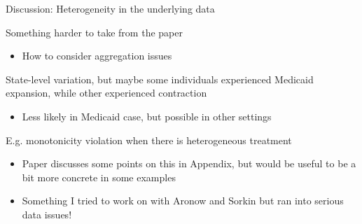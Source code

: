 \documentclass[notes,11pt, aspectratio=169]{beamer}
\newenvironment{wideitemize}{\itemize\addtolength{\itemsep}{10pt}}{\enditemize}
\begin{document}
\begin{frame}{Discussion: Heterogeneity in the underlying data}
  \begin{wideitemize}
  \item Something harder to take from the paper
    \begin{itemize}
    \item How to consider aggregation issues
    \end{itemize}
  \item State-level variation, but maybe some individuals experienced Medicaid expansion, while other experienced contraction
    \begin{itemize}
    \item Less likely in Medicaid case, but possible in other settings
    \end{itemize}
  \item E.g. monotonicity violation when there is heterogeneous treatment
    \begin{itemize}
    \item Paper discusses some points on this in Appendix, but would be useful to be a bit more concrete in some examples
    \item Something I tried to work on with Aronow and Sorkin but ran into serious data issues!
    \end{itemize}
  \end{wideitemize}
\end{frame}
\end{document}
